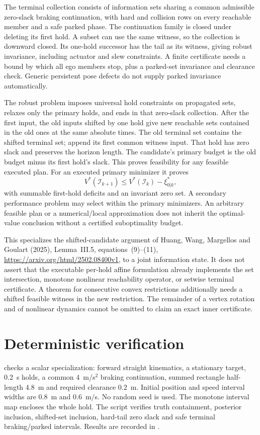 \documentclass[11pt]{article}
\begin{document}
The terminal collection consists of information sets sharing a common
admissible zero-slack braking continuation, with hard and collision rows
on every reachable member and a safe parked phase. The continuation family
is closed under deleting its first hold. A subset can use the same
witness, so the collection is downward closed. Its one-hold successor has
the tail as its witness, giving robust invariance, including actuator and
slew constraints. A finite certificate needs a bound by which all ego
members stop, plus a parked-set invariance and clearance check. Generic
persistent pose defects do not supply parked invariance automatically.

The robust problem imposes universal hold constraints on propagated sets,
relaxes only the primary holds, and ends in that zero-slack collection.
After the first input, the old inputs shifted by one hold give new reachable
sets contained in the old ones at the same absolute times. The old terminal
set contains the shifted terminal set; append its first common witness
input. That hold has zero slack and preserves the horizon length. The
candidate's primary budget is the old budget minus its first hold's slack.
This proves feasibility for any feasible executed plan. For an executed
primary minimizer it proves
\[
 V^*(\mathcal I_{k+1})\le V^*(\mathcal I_k)-\xi^*_{0|k},
\]
with summable first-hold deficits and an invariant zero set. A secondary
performance problem may select within the primary minimizers. An arbitrary
feasible plan or a numerical/local approximation does not inherit the
optimal-value conclusion without a certified suboptimality budget.

This specializes the shifted-candidate argument of Huang, Wang, Margellos
and Goulart (2025), Lemma~III.5, equations~(9)--(11),
\url{https://arxiv.org/html/2502.08400v1}, to a joint information state.
It does not assert that the executable per-hold affine formulation already
implements the set intersection, monotone nonlinear reachability operator,
or setwise terminal certificate. A theorem for consecutive convex
restrictions additionally needs a shifted feasible witness in the new
restriction. The remainder of a vertex rotation and of nonlinear dynamics
cannot be omitted to claim an exact inner certificate.

\section{Deterministic verification}
 checks a scalar
specialization: forward straight kinematics, a stationary target, 0.2~s
holds, a common 4~m/s$^2$ braking continuation, summed rectangle half-length
4.8~m and required clearance 0.2~m. Initial position and speed interval
widths are 0.8~m and 0.6~m/s. No random seed is used. The monotone interval
map encloses the whole hold. The script verifies truth containment,
posterior inclusion, shifted-set inclusion, hard-tail zero slack and safe
terminal braking/parked intervals. Results are recorded in
.
\end{document}
